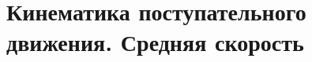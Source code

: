 \documentclass[12pt, a4paper]{article}
\begin{document}
\section{Кинематика поступательного движения. Средняя скорость}






















\end{document}
